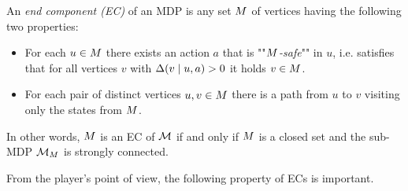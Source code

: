 \begin{definition}
	\label{5-def:ec}
An \emph{end component (EC)} of an MDP is any set $M$ of vertices having the following two properties:
\begin{itemize}
 \item For each $u \in M$ there exists an action $ a $ that is ""\emph{$ M$-safe}"" in $ u $, i.e. satisfies that for all vertices  $v$ with $ \Delta(v \mid u,a) > 0 $ it holds $ v \in M $.
 \item For each pair of distinct vertices $ u,v \in M$ there is a path from $ u $ to $ v $ visiting only the states from $M$.
\end{itemize}
In other words, $ M $ is an EC of $ \mathcal{M} $ if and only if $ M $ is a closed set and the sub-MDP $ \mathcal{M}_M $ is strongly connected. 
\end{definition}


\noindent
From the player's point of view, the following property of ECs is important.

